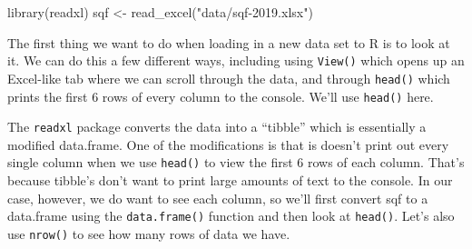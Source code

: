 \documentclass[
]{krantz}
\makeatletter
\newenvironment{Shaded}{\begin{snugshade}}{\end{snugshade}}
\newcommand{\FunctionTok}[1]{\textcolor[rgb]{0,0,0}{#1}}
\newcommand{\NormalTok}[1]{#1}
\newcommand{\OtherTok}[1]{\textcolor[rgb]{0.37,0.37,0.37}{#1}}
\newcommand{\StringTok}[1]{\textcolor[rgb]{0.5,0.5,0.5}{#1}}
\newenvironment{kframe}{%
\medskip{}
\setlength{\fboxsep}{.8em}
 \def\at@end@of@kframe{}%
 \ifinner\ifhmode%
  \def\at@end@of@kframe{\end{minipage}}%
  \begin{minipage}{\columnwidth}%
 \fi\fi%
 \def\FrameCommand##1{\hskip\@totalleftmargin \hskip-\fboxsep
 \colorbox{shadecolor}{##1}\hskip-\fboxsep
     \hskip-\linewidth \hskip-\@totalleftmargin \hskip\columnwidth}%
 \MakeFramed {\advance\hsize-\width
   \@totalleftmargin\z@ \linewidth\hsize
   \@setminipage}}%
 {\par\unskip\endMakeFramed%
 \at@end@of@kframe}
\renewenvironment{Shaded}{\begin{kframe}}{\end{kframe}}
\makeatother
\begin{document}
\begin{Shaded}
\begin{Highlighting}[]
\FunctionTok{library}\NormalTok{(readxl)}
\NormalTok{sqf }\OtherTok{\textless{}{-}} \FunctionTok{read\_excel}\NormalTok{(}\StringTok{"data/sqf{-}2019.xlsx"}\NormalTok{)}
\end{Highlighting}
\end{Shaded}

The first thing we want to do when loading in a new data set to R is to look at it. We can do this a few different ways, including using \texttt{View()} which opens up an Excel-like tab where we can scroll through the data, and through \texttt{head()} which prints the first 6 rows of every column to the console. We'll use \texttt{head()} here.

The \texttt{readxl} package converts the data into a ``tibble'' which is essentially a modified data.frame. One of the modifications is that is doesn't print out every single column when we use \texttt{head()} to view the first 6 rows of each column. That's because tibble's don't want to print large amounts of text to the console. In our case, however, we do want to see each column, so we'll first convert sqf to a data.frame using the \texttt{data.frame()} function and then look at \texttt{head()}. Let's also use \texttt{nrow()} to see how many rows of data we have.
\end{document}
